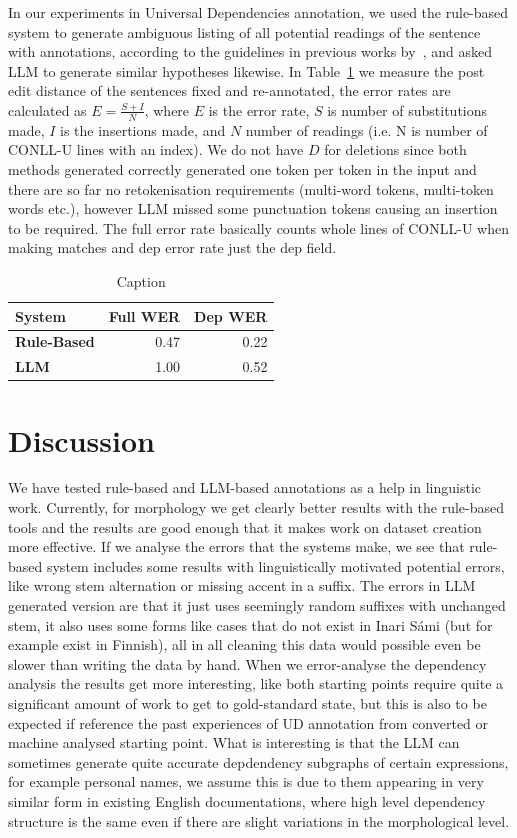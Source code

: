 \documentclass[free]{flammie}
\begin{document}
In our experiments in Universal Dependencies annotation, we used the rule-based
system to generate ambiguous listing of all potential readings of the sentence
with annotations, according to the guidelines in previous works
by~\cite{pirinen2019building}, and asked LLM to generate similar hypotheses
likewise.  In Table~\ref{table:ud} we measure the post edit distance of the
sentences fixed and re-annotated, the error rates are calculated as
$E=\frac{S+I}{N}$, where $E$ is the error rate, $S$ is number of substitutions
made, $I$ is the insertions made, and $N$ number of readings (i.e. N is number
of CONLL-U lines with an index). We do not have $D$ for deletions since both
methods generated correctly generated one token per token in the input and there
are so far no retokenisation requirements (multi-word tokens, multi-token words
etc.), however LLM missed some punctuation tokens causing an insertion to be
required. The full error rate basically counts whole lines of CONLL-U when
making matches and dep error rate just the dep field.

\begin{table}[]
    \centering
    \begin{tabular}{lrr}
    \toprule
    System & \bf Full WER & \bf Dep WER \\
    \midrule
    \bf Rule-Based & 0.47 & 0.22 \\
    \bf LLM  & 1.00 & 0.52 \\
    \bottomrule
    \end{tabular}
    \caption{Caption\label{table:ud}}
\end{table}

\section{Discussion}\label{sec:discussion}

We have tested rule-based and LLM-based annotations as a help in linguistic
work.  Currently, for morphology we get clearly better results with the
rule-based tools and the results are good enough that it makes work on dataset
creation more effective.  If we analyse the errors that the systems make, we see
that rule-based system includes some results with linguistically motivated
potential errors, like wrong stem alternation or missing accent in a suffix.
The errors in LLM generated version are that it just uses seemingly random
suffixes with unchanged stem, it also uses some forms like cases that do not
exist in Inari Sámi (but for example exist in Finnish), all in all cleaning this
data would possible even be slower than writing the data by hand.  When we
error-analyse the dependency analysis the results get more interesting, like
both starting points require quite a significant amount of work to get to
gold-standard state, but this is also to be expected if reference the past
experiences of UD annotation from converted or machine analysed starting point.
What is interesting is that the LLM can sometimes generate quite accurate
depdendency subgraphs of certain expressions, for example personal names, we
assume this is due to them appearing in very similar form in existing English
documentations, where high level dependency structure is the same even if there
are slight variations in the morphological level.
\end{document}
